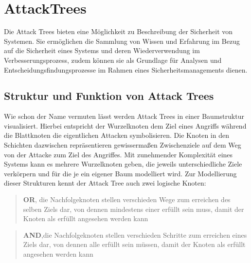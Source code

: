\section{AttackTrees}

Die Attack Trees bieten eine Möglichkeit zu Beschreibung der Sicherheit von Systemen. Sie ermöglichen die Sammlung von Wissen und Erfahrung im Bezug auf die Sicherheit eines Systems und deren Wiederverwendung im Verbesserungsprozess, zudem können sie als Grundlage für Analysen und Entscheidungsfindungsprozesse im Rahmen eines Sicherheitsmanagements dienen. \cite{schneier1999attacktree}

\subsection{Struktur und Funktion von Attack Trees}
Wie schon der Name vermuten lässt werden Attack Trees in einer Baumstruktur visualisiert. Hierbei entspricht der Wurzelknoten dem Ziel eines Angriffs während die Blattknoten die eigentlichen Attacken symbolisieren. \cite{schneier1999attacktree} Die Knoten in den Schichten dazwischen repräsentieren gewissermaßen Zwischenziele auf dem Weg von der Attacke zum Ziel des Angriffes. Mit zunehmender Komplexität eines Systems kann es mehrere Wurzelknoten geben, die jeweils unterschiedliche Ziele verkörpern und für die je ein eigener Baum modelliert wird. Zur Modellierung dieser Strukturen kennt der Attack Tree auch zwei logische Knoten:

\begin{quote}
\textbf{OR}, die Nachfolgeknoten stellen verschieden Wege zum erreichen des selben Ziels dar, von dennen mindestens einer erfüllt sein muss, damit der Knoten als erfüllt angesehen werden kann \cite{schneier1999attacktree}
\end{quote}
\begin{quote}
\textbf{AND},die Nachfolgeknoten stellen verschieden Schritte zum erreichen eines Ziels dar, von dennen alle erfüllt sein müssen, damit der Knoten als erfüllt angesehen werden kann \cite{schneier1999attacktree}
\end{quote}

